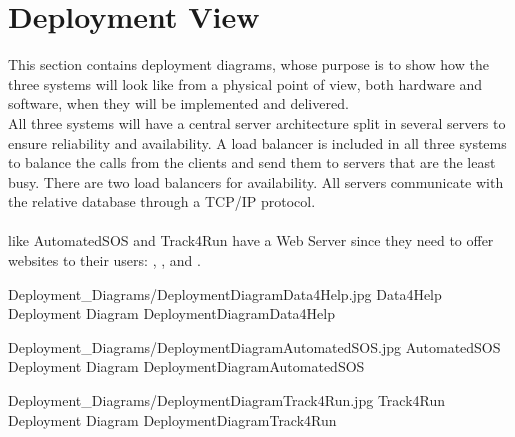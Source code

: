 \documentclass[../../DD.tex]{subfiles}
\begin{document}
\section{Deployment View}
	
	This section contains deployment diagrams, whose purpose is to show how the three systems will look like from a physical point of view, both hardware and software, when they will be implemented and delivered.\\
	All three systems will have a central server architecture split in several servers to ensure reliability and availability. A load balancer is included in all three systems to balance the calls from the clients and send them to servers that are the least busy. There are two load balancers for availability. All servers communicate with the relative database through a TCP/IP protocol.\\\\
	 like AutomatedSOS and Track4Run have a Web Server since they need to offer websites to their users: , ,  and .

	\image {13cm} {Deployment_Diagrams/DeploymentDiagramData4Help.jpg} {Data4Help Deployment Diagram} {DeploymentDiagramData4Help}

	\image {13cm} {Deployment_Diagrams/DeploymentDiagramAutomatedSOS.jpg} {AutomatedSOS Deployment Diagram} {DeploymentDiagramAutomatedSOS}

	\image {13cm} {Deployment_Diagrams/DeploymentDiagramTrack4Run.jpg} {Track4Run Deployment Diagram} {DeploymentDiagramTrack4Run}
	
\end{document}
